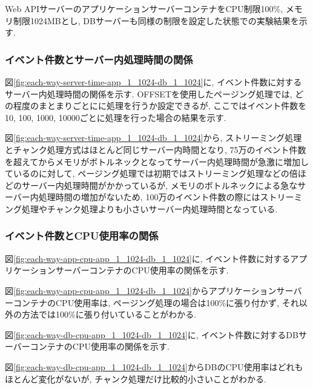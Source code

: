 \documentclass[../../../../main]{subfiles}
\begin{document}
    Web APIサーバーのアプリケーションサーバーコンテナをCPU制限100\%, メモリ制限1024MBとし, DBサーバーも同様の制限を設定した状態での実験結果を示す.

    \subsubsection{イベント件数とサーバー内処理時間の関係}\label{subsubsubsec:result-each-way-only-limit-server-time}

    図\ref{fig:each-way-server-time-app_1_1024-db_1_1024}に, イベント件数に対するサーバー内処理時間の関係を示す. OFFSETを使用したページング処理では, どの程度のまとまりごとにに処理を行うか設定できるが, ここではイベント件数を10, 100, 1000, 10000ごとに処理を行った場合の結果を示す.

    

    図\ref{fig:each-way-server-time-app_1_1024-db_1_1024}から, ストリーミング処理とチャンク処理方式はほとんど同じサーバー内時間となり, 75万のイベント件数を超えてからメモリがボトルネックとなってサーバー内処理時間が急激に増加しているのに対して, ページング処理では初期ではストリーミング処理などの倍ほどのサーバー内処理時間がかかっているが, メモリのボトルネックによる急なサーバー内処理時間の増加がないため, 100万のイベント件数の際にはストリーミング処理やチャンク処理よりも小さいサーバー内処理時間となっている.

    \subsubsection{イベント件数とCPU使用率の関係}\label{subsubsubsec:result-each-way-only-limit-cpu}

    図\ref{fig:each-way-app-cpu-app_1_1024-db_1_1024}に, イベント件数に対するアプリケーションサーバーコンテナのCPU使用率の関係を示す.

    

    図\ref{fig:each-way-app-cpu-app_1_1024-db_1_1024}からアプリケーションサーバーコンテナのCPU使用率は, ページング処理の場合は100\%に張り付かず, それ以外の方法では100\%に張り付いていることがわかる.

    図\ref{fig:each-way-db-cpu-app_1_1024-db_1_1024}に, イベント件数に対するDBサーバーコンテナのCPU使用率の関係を示す.

    

    図\ref{fig:each-way-db-cpu-app_1_1024-db_1_1024}からDBのCPU使用率はどれもほとんど変化がないが, チャンク処理だけ比較的小さいことがわかる.
\end{document}
